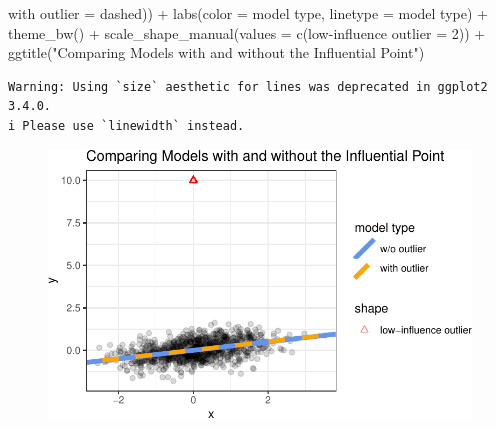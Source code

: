 \documentclass[
  letterpaper,
  DIV=11,
  numbers=noendperiod]{scrreport}
\newenvironment{Shaded}{\begin{snugshade}}{\end{snugshade}}
\newcommand{\AttributeTok}[1]{\textcolor[rgb]{0.40,0.45,0.13}{#1}}
\newcommand{\DecValTok}[1]{\textcolor[rgb]{0.68,0.00,0.00}{#1}}
\newcommand{\FunctionTok}[1]{\textcolor[rgb]{0.28,0.35,0.67}{#1}}
\newcommand{\NormalTok}[1]{\textcolor[rgb]{0.00,0.23,0.31}{#1}}
\newcommand{\OtherTok}[1]{\textcolor[rgb]{0.00,0.23,0.31}{#1}}
\newcommand{\SpecialCharTok}[1]{\textcolor[rgb]{0.37,0.37,0.37}{#1}}
\newcommand{\StringTok}[1]{\textcolor[rgb]{0.13,0.47,0.30}{#1}}
\begin{document}
\begin{Shaded}
\begin{Highlighting}[]
                                   \StringTok{\textquotesingle{}with outlier\textquotesingle{}} \OtherTok{=} \StringTok{\textquotesingle{}dashed\textquotesingle{}}\NormalTok{)) }\SpecialCharTok{+} 
  \FunctionTok{labs}\NormalTok{(}\AttributeTok{color =} \StringTok{\textquotesingle{}model type\textquotesingle{}}\NormalTok{, }\AttributeTok{linetype =} \StringTok{\textquotesingle{}model type\textquotesingle{}}\NormalTok{) }\SpecialCharTok{+} 
  \FunctionTok{theme\_bw}\NormalTok{() }\SpecialCharTok{+} 
  \FunctionTok{scale\_shape\_manual}\NormalTok{(}\AttributeTok{values =} \FunctionTok{c}\NormalTok{(}\StringTok{\textquotesingle{}low{-}influence outlier\textquotesingle{}} \OtherTok{=} \DecValTok{2}\NormalTok{)) }\SpecialCharTok{+} 
  \FunctionTok{ggtitle}\NormalTok{(}\StringTok{"Comparing Models with and without the Influential Point"}\NormalTok{)}
\end{Highlighting}
\end{Shaded}

\begin{verbatim}
Warning: Using `size` aesthetic for lines was deprecated in ggplot2 3.4.0.
i Please use `linewidth` instead.
\end{verbatim}

\begin{figure}[H]

{\centering \includegraphics{week4/week4_files/figure-pdf/unnamed-chunk-10-1.pdf}

}

\end{figure}
\end{document}
